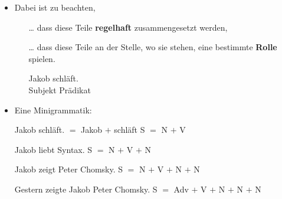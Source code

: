 \begin{frame}

\begin{itemize}
\item Dabei ist zu beachten, 

\begin{itemize}

	\item [\dots] dass diese Teile \textbf{regelhaft} zusammengesetzt werden,

	\eal 
	\zl

\pause

	\item [\dots] dass diese Teile an der Stelle, wo sie stehen, eine bestimmte \textbf{Rolle} spielen.
			
	\ea
	\gll Jakob schläft.\\
	Subjekt Prädikat\\
	\z
	
\end{itemize}

\end{itemize}

\end{frame}


\begin{frame}

\begin{itemize}
	\item Eine Minigrammatik:

	\eal 
	\ex Jakob schläft. $=$ Jakob $+$ schläft
\pause	
	\ex	S $=$ N $+$ V 
	\zl

\pause
	
	\eal 
	\ex Jakob liebt Syntax.
\pause
	\ex S $=$ N $+$ V $+$ N
	\zl

\pause
		
	\eal 
	\ex Jakob zeigt Peter Chomsky.
\pause
	\ex S $=$ N $+$ V $+$ N $+$ N 
	\zl
	
\pause
	
	\eal 
	\ex Gestern zeigte Jakob Peter Chomsky.
\pause
	\ex S $=$ Adv $+$ V $+$ N $+$ N $+$ N 
	\zl

\end{itemize}

\end{frame}


